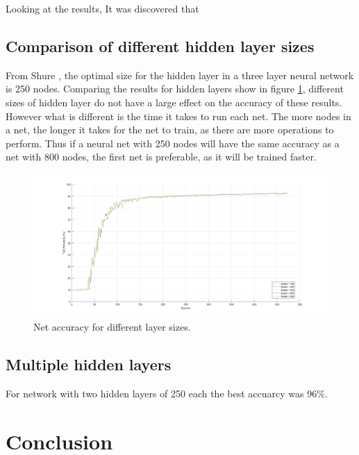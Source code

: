 \documentclass[12pt]{article}
\begin{document}
	
	
	
	Looking at the results,  It was discovered that 
	
	\subsection{Comparison of different hidden layer sizes}
	
	From Shure \cite{matlabNNBeg}, the optimal size for the hidden layer in a three layer neural network is 250 nodes. Comparing the results for hidden layers show in figure \ref{fig:multiplelayers}, different sizes of hidden layer do not have a large effect on the accuracy of these results. However what is different is the time it takes to run each net. The more nodes in a net, the longer it takes for the net to train, as there are more operations to perform. Thus if a neural net with 250 nodes will have the same accuracy as a net with 800 nodes, the first net is preferable, as it will be trained faster.
	
	
	\begin{figure}
		\centering
		\includegraphics[width=0.7\linewidth]{multipleLayers}
		\caption{Net accuracy for different layer sizes.}
		\label{fig:multiplelayers}
	\end{figure}
	
	
	\subsection{Multiple hidden layers}
	For network with two hidden layers of 250 each the best accuarcy was 96\%.
	
	
	
	
	
	


	
	\section{Conclusion}
	
\end{document}
